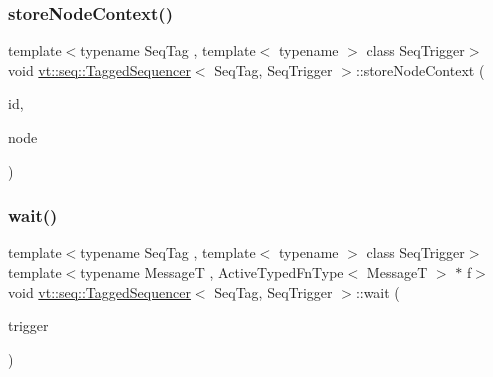 \subsubsection{\texorpdfstring{store\+Node\+Context()}{storeNodeContext()}}
{\footnotesize\ttfamily template$<$typename Seq\+Tag , template$<$ typename $>$ class Seq\+Trigger$>$ \\
void \hyperlink{structvt_1_1seq_1_1_tagged_sequencer}{vt\+::seq\+::\+Tagged\+Sequencer}$<$ Seq\+Tag, Seq\+Trigger $>$\+::store\+Node\+Context (\begin{DoxyParamCaption}\item[{\hyperlink{structvt_1_1seq_1_1_tagged_sequencer_a1c8ee839258d0f88c49ef660267a81d5}{Seq\+Type} const \&}]{id,  }\item[{\hyperlink{namespacevt_1_1seq_ae6a4874b585be0612aaca32ca6d2d191}{Seq\+Node\+Ptr\+Type}}]{node }\end{DoxyParamCaption})}

\mbox{\label{structvt_1_1seq_1_1_tagged_sequencer_a9a1be66a0b4667009824bbfbf9a5f7d1}} 
\subsubsection{\texorpdfstring{wait()}{wait()}\hspace{0.1cm}{\footnotesize\ttfamily [1/2]}}
{\footnotesize\ttfamily template$<$typename Seq\+Tag , template$<$ typename $>$ class Seq\+Trigger$>$ \\
template$<$typename MessageT , Active\+Typed\+Fn\+Type$<$ Message\+T $>$ $\ast$ f$>$ \\
void \hyperlink{structvt_1_1seq_1_1_tagged_sequencer}{vt\+::seq\+::\+Tagged\+Sequencer}$<$ Seq\+Tag, Seq\+Trigger $>$\+::wait (\begin{DoxyParamCaption}\item[{\hyperlink{structvt_1_1seq_1_1_tagged_sequencer_a4b015f2f7d3197a66af5576f0e63a834}{Seq\+Trigger\+Type}$<$ MessageT $>$}]{trigger }\end{DoxyParamCaption})}

\mbox{\label{structvt_1_1seq_1_1_tagged_sequencer_a8c96cc7cc925cfd95b0e90d5e29b2211}} 
